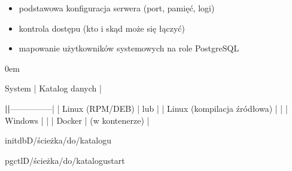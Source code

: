 \documentclass[letterpaper,10pt,english]{sphinxmanual}
\begin{document}
\sphinxAtStartPar
{}
\begin{itemize}
\item {} 
\sphinxAtStartPar
{} \textendash{} podstawowa konfiguracja serwera (port, pamięć, logi)

\item {} 
\sphinxAtStartPar
{} \textendash{} kontrola dostępu (kto i skąd może się łączyć)

\item {} 
\sphinxAtStartPar
{} \textendash{} mapowanie użytkowników systemowych na role PostgreSQL

\end{itemize}

\sphinxAtStartPar
{}

\begin{DUlineblock}{0em}
\item[] System | Katalog danych |
\end{DUlineblock}

\sphinxAtStartPar
{\color{red}\bfseries{}|\sphinxhyphen{}\sphinxhyphen{}\sphinxhyphen{}\sphinxhyphen{}\sphinxhyphen{}\sphinxhyphen{}\sphinxhyphen{}\sphinxhyphen{}|}—————\sphinxhyphen{}|
| Linux (RPM/DEB) |  lub  |
| Linux (kompilacja źródłowa) |  |
| Windows |  |
| Docker |  (w kontenerze) |

\sphinxAtStartPar
{}

\begin{sphinxVerbatim}[commandchars=\\\{\}]
initdb\PYGZhy{}D/ścieżka/do/katalogu

pg\PYGZus{}ctl\PYGZhy{}D/ścieżka/do/katalogustart
\end{sphinxVerbatim}

\sphinxAtStartPar
{}
\end{document}
